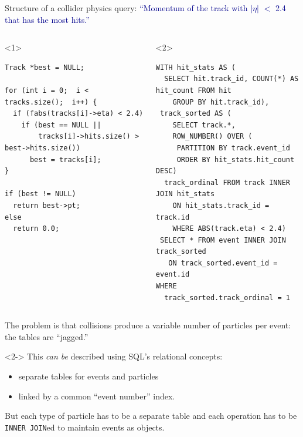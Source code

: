 \documentclass[aspectratio=169]{beamer}
\begin{document}
\begin{frame}[fragile]{Structure of a collider physics query: }
\large
\vspace{0.5 cm}
\textcolor{darkblue}{``Momentum of the track with $|\eta|$ $<$ 2.4 that has the most hits.''}

\small
\begin{columns}
\begin{onlyenv}<1>
\begin{verbatim}
Track *best = NULL;

for (int i = 0;  i < tracks.size();  i++) {
  if (fabs(tracks[i]->eta) < 2.4)
    if (best == NULL ||
        tracks[i]->hits.size() > best->hits.size())
      best = tracks[i];
}

if (best != NULL)
  return best->pt;
else
  return 0.0;


\end{verbatim}
\end{onlyenv}
\begin{onlyenv}<2>
\begin{verbatim}
WITH hit_stats AS (
  SELECT hit.track_id, COUNT(*) AS hit_count FROM hit
    GROUP BY hit.track_id),
 track_sorted AS (
    SELECT track.*, 
    ROW_NUMBER() OVER (
     PARTITION BY track.event_id
     ORDER BY hit_stats.hit_count DESC)
  track_ordinal FROM track INNER JOIN hit_stats
    ON hit_stats.track_id = track.id
    WHERE ABS(track.eta) < 2.4)
 SELECT * FROM event INNER JOIN track_sorted
   ON track_sorted.event_id = event.id
WHERE
  track_sorted.track_ordinal = 1
\end{verbatim}
\end{onlyenv}
\end{columns}
\end{frame}

\begin{frame}{}
\large
\vspace{1.25 cm}
The problem is that collisions produce a variable number of particles per event: the tables are ``jagged.''

\vspace{0.75 cm}
\begin{uncoverenv}<2->
This {\it can be} described using SQL's relational concepts:

\begin{itemize}
\item separate tables for events and particles
\item linked by a common ``event number'' index.
\end{itemize}

But each type of particle has to be a separate table and each operation has to be \texttt{INNER JOIN}ed to maintain events as objects.
\end{uncoverenv}

\vspace{0.75 cm}
\end{frame}
\end{document}
